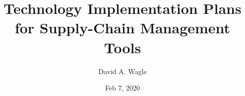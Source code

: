 \title{Technology Implementation Plans for Supply-Chain Management Tools}
\author{David A. Wagle}
\date{Feb 7, 2020}
